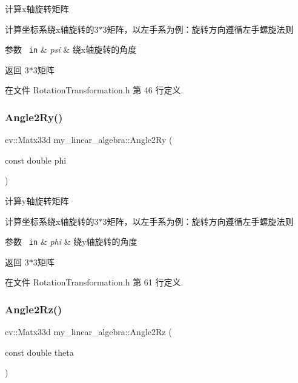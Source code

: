 计算x轴旋转矩阵 

计算坐标系绕x轴旋转的3$\ast$3矩阵，以左手系为例：旋转方向遵循左手螺旋法则


\begin{DoxyParams}[1]{参数}
\mbox{\texttt{ in}}  & {\em psi} & 绕x轴旋转的角度 \\
\hline
\end{DoxyParams}
\begin{DoxyReturn}{返回}
3$\ast$3矩阵 
\end{DoxyReturn}


在文件 Rotation\+Transformation.\+h 第 46 行定义.

\mbox{\label{namespacemy__linear__algebra_aa49a94528c255627f05e020b5be3f1e3}} 
\subsubsection{\texorpdfstring{Angle2Ry()}{Angle2Ry()}}
{\footnotesize\ttfamily cv\+::\+Matx33d my\+\_\+linear\+\_\+algebra\+::\+Angle2\+Ry (\begin{DoxyParamCaption}\item[{const double}]{phi }\end{DoxyParamCaption})}



计算y轴旋转矩阵 

计算坐标系绕x轴旋转的3$\ast$3矩阵，以左手系为例：旋转方向遵循左手螺旋法则


\begin{DoxyParams}[1]{参数}
\mbox{\texttt{ in}}  & {\em phi} & 绕y轴旋转的角度 \\
\hline
\end{DoxyParams}
\begin{DoxyReturn}{返回}
3$\ast$3矩阵 
\end{DoxyReturn}


在文件 Rotation\+Transformation.\+h 第 61 行定义.

\mbox{\label{namespacemy__linear__algebra_a5b7ede204e82cae38ed044eea54e4d79}} 
\subsubsection{\texorpdfstring{Angle2Rz()}{Angle2Rz()}}
{\footnotesize\ttfamily cv\+::\+Matx33d my\+\_\+linear\+\_\+algebra\+::\+Angle2\+Rz (\begin{DoxyParamCaption}\item[{const double}]{theta }\end{DoxyParamCaption})}



